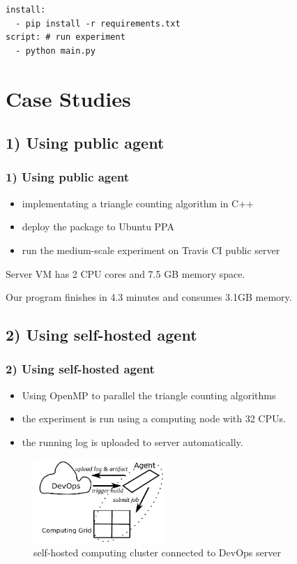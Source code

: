 \documentclass[notheorems]{beamer}
\begin{document}
\begin{frame}[fragile]
\begin{lstlisting}[caption={workflow description}, label={lst:wd}, captionpos=b, xleftmargin=.25\textwidth]
install: 
  - pip install -r requirements.txt
script: # run experiment
  - python main.py
\end{lstlisting}

\end{frame}
\section{Case Studies}
\frame{\tableofcontents[currentsection]}
\subsection{1) Using public agent}
\begin{frame}
\frametitle{1) Using public agent}
\begin{itemize}
\item implementating a triangle counting algorithm in C++
\item deploy the package to Ubuntu PPA
\item run the medium-scale experiment on Travis CI public server
\end{itemize}
Server VM has 2 CPU cores and 7.5 GB memory space.

Our program finishes in 4.3 minutes and consumes 3.1GB memory.
\end{frame}
\subsection{2) Using self-hosted agent}
\begin{frame}
\frametitle{2) Using self-hosted agent}
\begin{itemize}
\item Using OpenMP to parallel the triangle counting algorithms
\item the experiment is run using a computing node with 32 CPUs.
\item the running log is uploaded to server automatically.
\end{itemize}
\begin{figure}
\includegraphics[width=5cm]{../self-hosted.pdf}
\caption{self-hosted computing cluster connected to DevOps server}
\end{figure}
\end{frame}
\end{document}
